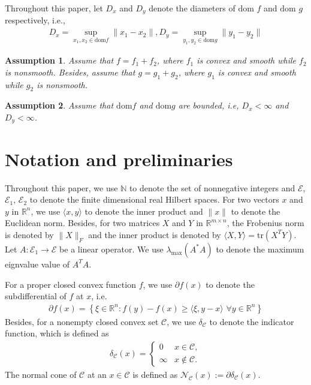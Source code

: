 \documentclass{article}
\numberwithin{equation}{section}
\newtheorem{assumption}{Assumption}[section]
\begin{document}
Throughout this paper, let $D_x$ and $D_y$ denote the diameters of $\mathrm{dom}$ $f$ 
and $\mathrm{dom}$ $g$ respectively, i.e.,
\begin{align} \label{Definition_of_diameter}
    D_x = \sup\limits_{x_1,x_2\in \mathrm{dom}f}\|x_1 -x_2\rVert,
    D_y = \sup\limits_{y_1,y_2\in \mathrm{dom}g}\|y_1 -y_2\rVert
\end{align}

\begin{assumption} \label{Assumption 1}
    Assume that $f = f_1 +f_2$, 
    where $f_1$ is convex and smooth while $f_2$ is nonsmooth.
    Besides, assume that   
    $g = g_1 +g_2$, where $g_1$ is convex and smooth while $g_2$ is nonsmooth. 
\end{assumption}

\begin{assumption} \label{Assumption 2}
    Assume that $\mathrm{dom} f$ and $\mathrm{dom} g$ are bounded, i.e, $D_x<\infty$ and $D_y < \infty$. 
\end{assumption}

\section{Notation and preliminaries}
Throughout this paper, we use $\mathbb{N}$ to denote the set of nonnegative integers and $\mathcal{E}$, $\mathcal{E}_1$, $\mathcal{E}_2$ to denote the 
finite dimensional real Hilbert spaces. For two vectors $x$ and $y$ in $\mathbb{R}^n$, we use $\langle x,y\rangle$
to denote the inner product and $\|x\rVert$ to denote the Euclidean norm. Besides, for two matrices 
$X$ and $Y$ in $\mathbb{R}^{m\times n}$, the Frobenius norm is denoted by $\|X\rVert_F$ and 
the inner product is denoted by $\langle X,Y \rangle =\mathrm{tr}\left(X^TY\right)$.
Let $A: \mathcal{E}_1\rightarrow \mathcal{E}$ be a linear operator. We use $\lambda_{\max}(A^*A)$ to denote the maximum eignvalue value of $A^TA  $.

For a proper closed convex function $f$, we use $\partial f(x)$ to denote the subdifferential of $f$ at $x$, 
i.e.
\begin{align}
    \partial f(x) = \left\{\xi \in \mathbb{R}^n: f(y)- f(x) \geq\langle \xi, y-x \rangle \hspace{4pt} \forall y \in \mathbb{R}^n\right\}
    \nonumber
\end{align}
Besides, for a nonempty closed convex set $\mathcal{C}$, we use $\delta_{\mathcal{C}}$ to denote the indicator function, which
is defined as 
\begin{align}
    \delta_{\mathcal{C}}(x) = \left\{ 
        \begin{array}{cc}
            0  & x\in \mathcal{C},  \nonumber \\
            \infty & x \notin \mathcal{C}.  \nonumber
        \end{array}
     \right.  \nonumber
\end{align}
The normal cone of $\mathcal{C}$ at an $x\in\mathcal{C}$ is 
defined as $\mathcal{N}_{\mathcal{C}}(x):=\partial\delta_{\mathcal{C}}(x)$. 
\end{document}
